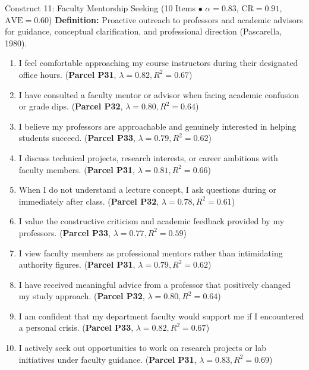 \documentclass[10pt,a4paper]{article}
\begin{document}
\vspace{0.2cm}
\begin{constructbox}{Construct 11: Faculty Mentorship Seeking (10 Items $\bullet$ $\alpha = 0.83$, $\text{CR} = 0.91$, $\text{AVE} = 0.60$)}
\textbf{Definition:} Proactive outreach to professors and academic advisors for guidance, conceptual clarification, and professional direction (Pascarella, 1980).
\begin{enumerate}[label=\textbf{Q\arabic*.}, leftmargin=2.5em, itemsep=2pt, resume]
  \item I feel comfortable approaching my course instructors during their designated office hours. \hfill (\textbf{Parcel P31}, $\lambda = 0.82, R^2 = 0.67$)
  \item I have consulted a faculty mentor or advisor when facing academic confusion or grade dips. \hfill (\textbf{Parcel P32}, $\lambda = 0.80, R^2 = 0.64$)
  \item I believe my professors are approachable and genuinely interested in helping students succeed. \hfill (\textbf{Parcel P33}, $\lambda = 0.79, R^2 = 0.62$)
  \item I discuss technical projects, research interests, or career ambitions with faculty members. \hfill (\textbf{Parcel P31}, $\lambda = 0.81, R^2 = 0.66$)
  \item When I do not understand a lecture concept, I ask questions during or immediately after class. \hfill (\textbf{Parcel P32}, $\lambda = 0.78, R^2 = 0.61$)
  \item I value the constructive criticism and academic feedback provided by my professors. \hfill (\textbf{Parcel P33}, $\lambda = 0.77, R^2 = 0.59$)
  \item I view faculty members as professional mentors rather than intimidating authority figures. \hfill (\textbf{Parcel P31}, $\lambda = 0.79, R^2 = 0.62$)
  \item I have received meaningful advice from a professor that positively changed my study approach. \hfill (\textbf{Parcel P32}, $\lambda = 0.80, R^2 = 0.64$)
  \item I am confident that my department faculty would support me if I encountered a personal crisis. \hfill (\textbf{Parcel P33}, $\lambda = 0.82, R^2 = 0.67$)
  \item I actively seek out opportunities to work on research projects or lab initiatives under faculty guidance. \hfill (\textbf{Parcel P31}, $\lambda = 0.83, R^2 = 0.69$)
\end{enumerate}
\end{constructbox}
\end{document}

